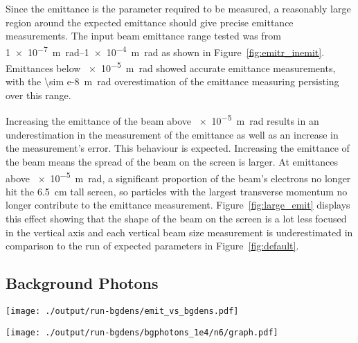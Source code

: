 Since the emittance is the parameter required to be measured, a reasonably large
region around the expected emittance should give precise emittance measurements.
The input beam emittance range tested was from \SIrange{1e-7}{1e-4}%
{\meter\radian} as shown in Figure~\ref{fig:emitr_inemit}. Emittances below
\SI{e-5}{\meter\radian} showed accurate emittance measurements, with the
\SI{\sim e-8}{\meter\radian} overestimation of the emittance measuring
persisting over this range.

Increasing the emittance of the beam above \SI{e-5}{\meter\radian} results in an
underestimation in the measurement of the emittance as well as an increase in
the measurement's error. This behaviour is expected. Increasing the emittance of
the beam means the spread of the beam on the screen is larger. At emittances
above \SI{e-5}{\meter\radian}, a significant proportion of the beam's electrons
no longer hit the \SI{6.5}{\centi\meter} tall screen, so particles with the
largest transverse momentum no longer contribute to the emittance measurement.
Figure~\ref{fig:large_emit} displays this effect showing that the shape of the
beam on the screen is a lot less focused in the vertical axis and each vertical
beam size measurement is underestimated in comparison to the run of expected
parameters in Figure~\ref{fig:default}.



\subsection{Background Photons}

\begin{figure*}[t]
	\begin{minipage}[t]{\columnwidth}
		\centering
		\texttt{[image: ./output/run-bgdens/emit\_vs\_bgdens.pdf]}
		\caption{
			Plot of the measured beam emittance against a factor of the expected
			background density of \SI{3.415e4}{photons\per\meter\squared}
		}
		\label{fig:emit_bgdens}
	\end{minipage}\hfill
	\begin{minipage}[t]{\columnwidth}
		\centering
		\texttt{[image: ./output/run-bgdens/bgphotons\_1e4/n6/graph.pdf]}
		\caption{
			Beam reconstruction for a background \num{1e4} times the expected
			background photon density.
		}
		\label{fig:large_bg}
	\end{minipage}
\end{figure*}

